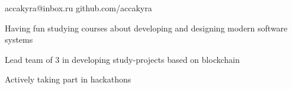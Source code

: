\documentclass[]{cv-style}
\begin{document}

    \vspace{1.5cm}

    {\color{white} \hspace*{-1cm} \LARGE{accakyra@inbox.ru}}
    {\color{white} \hspace*{1cm} \LARGE{github.com/accakyra}}

    \vspace{1.5cm}


    \vspace{0.2cm}
    \hspace*{0.7cm} {Having fun studying courses about developing and designing modern software systems}
    {\par}
    \hspace*{0.7cm} {Lead team of 3 in developing study-projects based on blockchain}
    {\par}
    \hspace*{0.7cm} {Actively taking part in hackathons}
    \vspace{0.3cm}
    {\newline}

    \vspace{1cm}

\end{document}
